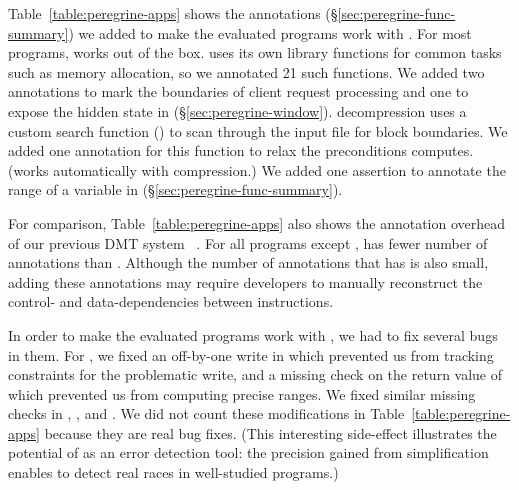Table~\ref{table:peregrine-apps} shows the annotations (\S\ref{sec:peregrine-func-summary}) we
added to make the evaluated programs work with \peregrine.  For most programs,
\peregrine works out of the box.  \apache uses its own library functions for
common tasks such as memory allocation, so we annotated 21 such
functions.  We added two annotations to mark the boundaries of client
request processing and one to expose the hidden state
in \apache (\S\ref{sec:peregrine-window}).  \pbzip decompression
uses a custom search function () to scan through the input file
for block boundaries.  We added one annotation for this function to relax
the preconditions \peregrine computes.  (\peregrine works automatically with \pbzip
compression.)  We added one assertion to annotate the range of a variable
in \fft (\S\ref{sec:peregrine-func-summary}).

For comparison, Table~\ref{table:peregrine-apps} also shows the annotation overhead of our previous DMT system \tern~\cite{cui:tern:osdi10}.  For all programs except \apache, \peregrine
has fewer number of annotations than \tern.  Although the number
of annotations that \tern has is also small, adding these annotations may
require developers to manually reconstruct the control- and
data-dependencies between instructions.


In order to make the evaluated programs work with \peregrine, we had to fix several bugs
in them.  For \aget, we fixed an off-by-one write in  which
prevented us from tracking constraints for the problematic write, and a
missing check on the return value of  which prevented us from
computing precise ranges.  We fixed similar missing checks in \swaptions,
\streamcluster, and \radix.  We did not count these modifications in
Table~\ref{table:peregrine-apps} because they are real bug fixes.  (This interesting
side-effect illustrates the potential of \peregrine as an error detection tool:
the precision gained from simplification enables \peregrine to detect real races
in well-studied programs.)


